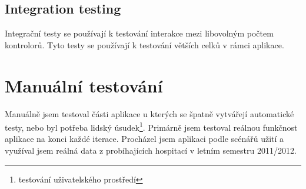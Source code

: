 \subsection{Integration testing}
Integrační testy se používají k testování interakce mezi libovolným počtem kontrolorů. Tyto testy se používají k testování větších celků v rámci aplikace.

\section{Manuální testování}
Manuálně jsem testoval části aplikace u kterých se špatně vytvářejí automatické testy, nebo byl potřeba lidský úsudek\footnote{testování uživatelského prostředí}. Primárně jsem testoval reálnou funkčnost aplikace na konci každé iterace. Procházel jsem aplikaci podle scénářů užití a využíval jsem reálná data z probíhajících hospitací v letním semestru 2011/2012.